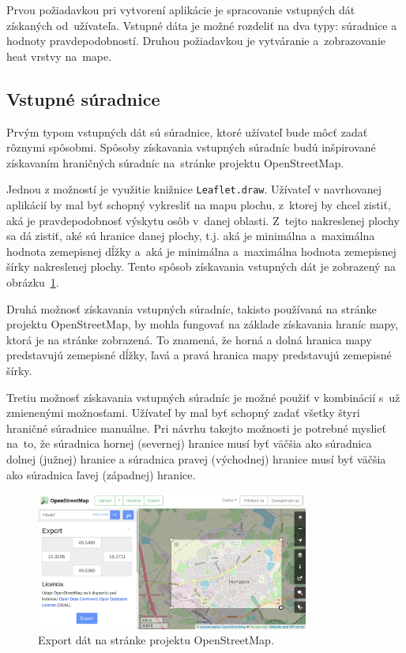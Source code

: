 Prvou požiadavkou pri vytvorení aplikácie je spracovanie vstupných dát získaných od~užívateľa. Vstupné dáta je možné rozdeliť na dva typy: súradnice a hodnoty pravdepodobností. Druhou požiadavkou je vytváranie a~zobrazovanie heat vrstvy na~mape.

\subsection*{Vstupné súradnice}
Prvým typom vstupných dát sú súradnice, ktoré užívateľ bude môcť zadať rôznymi spôsobmi. Spôsoby získavania vstupných súradníc budú inšpirované získavaním hraničných súradníc na~stránke projektu OpenStreetMap.

Jednou z možností je využitie knižnice \texttt{Leaflet.draw}. Užívateľ v navrhovanej aplikácií by mal byť schopný vykresliť na mapu plochu, z~ktorej by chcel zistiť, aká je pravdepodobnosť výskytu osôb v~danej oblasti. Z~tejto nakreslenej plochy sa dá zistiť, aké sú hranice danej plochy, t.j. aká je minimálna a~maximálna hodnota zemepisnej dĺžky a~aká je minimálna a~maximálna hodnota zemepisnej šírky nakreslenej plochy. Tento spôsob získavania vstupných dát je zobrazený na obrázku~\ref{fig:osm-export}.

Druhá možnosť získavania vstupných súradníc, takisto používaná na stránke projektu OpenStreetMap, by mohla fungovať na základe získavania hraníc mapy, ktorá je na stránke zobrazená. To znamená, že horná a dolná hranica mapy predstavujú zemepisné dĺžky, ľavá a pravá hranica mapy predstavujú zemepisné šírky.

Tretiu možnosť získavania vstupných súradníc je možné použiť v kombinácií s~už zmienenými možnosťami. Užívateľ by mal byť schopný zadať všetky štyri hraničné súradnice manuálne. Pri návrhu takejto možnosti je potrebné myslieť na~to, že súradnica hornej (severnej) hranice musí byť väčšia ako súradnica dolnej (južnej) hranice a súradnica pravej (východnej) hranice musí byť väčšia ako súradnica ľavej (západnej) hranice.

\begin{figure}[ht]
    \centering
    \includegraphics[width=0.8\textwidth]{obrazky-figures/openstreetmap-export.png}
    \caption{Export dát na stránke projektu OpenStreetMap.}
    \label{fig:osm-export}
\end{figure}
    
